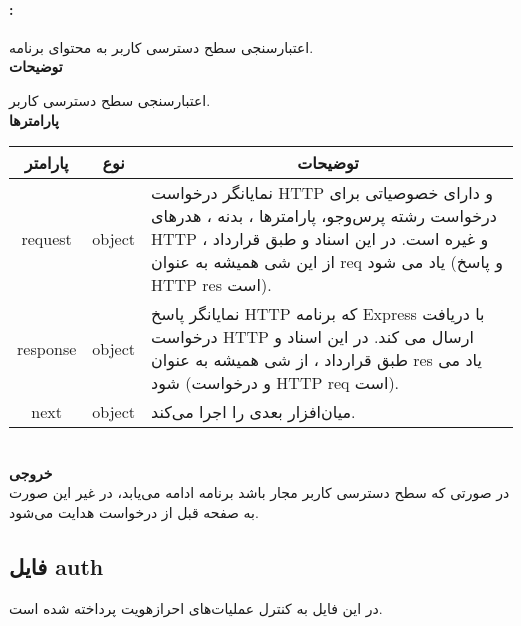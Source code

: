 \paragraph{:}
اعتبارسنجی سطح دسترسی کاربر به محتوای برنامه.
\\
\textbf{توضیحات}
\hr
\begin{flushleft}
	\framebox[.9\textwidth][l]{
		\lr{
			\textcolor{type}{void}
			\textcolor{func}{logInChecker}
			\textcolor{symb}{(}
			\textcolor{type}{object}
			\textcolor{arg}{request}
			\textcolor{symb}{,}
			\textcolor{type}{object}
			\textcolor{arg}{response}
			\textcolor{symb}{,}
			\textcolor{type}{object}
			\textcolor{arg}{next}
			\textcolor{symb}{);}
		}
	}
\end{flushleft}
اعتبارسنجی سطح دسترسی کاربر.
\\
\textbf{پارامترها}
\hr \\[10pt]
\begin{tabular}{|m{4cm}|m{3cm}|m{10cm}|}
	\hline
	\multicolumn{1}{|c}{پارامتر}
	&
	\multicolumn{1}{|c}{نوع}
	&
	\multicolumn{1}{|c|}{توضیحات}
	\\
	\hline
	\multicolumn{1}{|c}{request}
	&
	\multicolumn{1}{|c|}{object}
	&
	نمایانگر درخواست HTTP و دارای خصوصیاتی برای درخواست رشته پرس‌و‌جو، پارامترها ، بدنه ، هدرهای HTTP و غیره است.
	در این اسناد و طبق قرارداد ، از این شی همیشه به عنوان req یاد می شود (و پاسخ HTTP res است).
	\\
	\hline
	\multicolumn{1}{|c}{response}
	&
	\multicolumn{1}{|c|}{object}
	&
	نمایانگر پاسخ HTTP که برنامه Express با دریافت درخواست HTTP ارسال می کند.
	در این اسناد و طبق قرارداد ، از شی همیشه به عنوان res یاد می شود (و درخواست HTTP req است).
	\\
	\hline
	\multicolumn{1}{|c}{next}
	&
	\multicolumn{1}{|c|}{object}
	&
 میان‌افزار بعدی را اجرا می‌کند.
	\\
	\hline
\end{tabular}
\\[10pt]
\textbf{خروجی}
\hr \\
در صورتی که سطح دسترسی کاربر مجار باشد برنامه ادامه می‌یابد، در غیر این صورت به صفحه قبل از درخواست هدایت می‌شود.

\subsection{فایل auth}
در این فایل به کنترل عملیات‌های احرازهویت پرداخته شده است.

